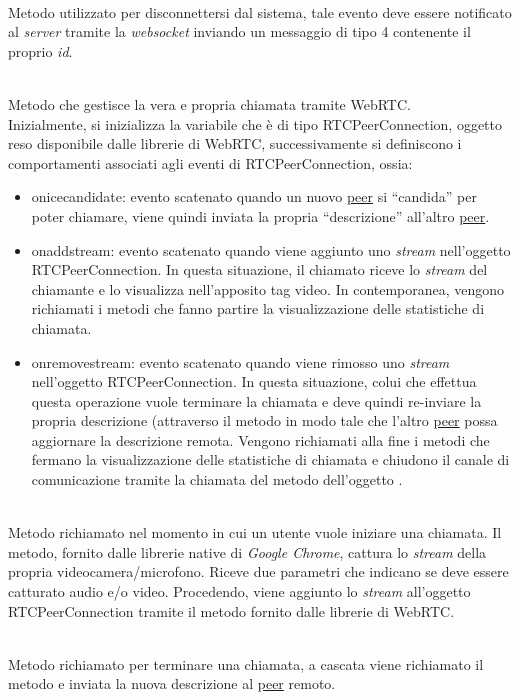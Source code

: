 \begin{description}
\item{}\\
Metodo utilizzato per disconnettersi dal sistema, tale evento deve essere notificato al \textit{server} tramite la \textit{websocket} inviando un messaggio di tipo 4 contenente il proprio \textit{id}.

\item{}\\
Metodo che gestisce la vera e propria chiamata tramite WebRTC.\\
Inizialmente, si inizializza la variabile  che è di tipo RTCPeerConnection, oggetto reso disponibile dalle librerie di WebRTC, successivamente si definiscono i comportamenti associati agli eventi di RTCPeerConnection, ossia:
\begin{itemize}
\item onicecandidate: evento scatenato quando un nuovo \underline{peer} si ``candida'' per poter chiamare, viene quindi inviata la propria ``descrizione'' all'altro \underline{peer}.
\item onaddstream: evento scatenato quando viene aggiunto uno \textit{stream} nell'oggetto RTCPeerConnection. In questa situazione, il chiamato riceve lo \textit{stream} del chiamante e lo visualizza nell'apposito tag video. In contemporanea, vengono richiamati i metodi che fanno partire la visualizzazione delle statistiche di chiamata.
\item onremovestream: evento scatenato quando viene rimosso uno \textit{stream} nell'oggetto RTCPeerConnection. In questa situazione, colui che effettua questa operazione vuole terminare la chiamata e deve quindi re-inviare la propria descrizione (attraverso il metodo  in modo tale che l'altro \underline{peer} possa aggiornare la descrizione remota. Vengono richiamati alla fine i metodi che fermano la visualizzazione delle statistiche di chiamata e chiudono il canale di comunicazione tramite la chiamata del metodo  dell'oggetto .
\end{itemize}

\item{}\\
Metodo richiamato nel momento in cui un utente vuole iniziare una chiamata. Il metodo, fornito dalle librerie native di \textit{Google Chrome}, cattura lo \textit{stream} della propria videocamera/microfono. Riceve due parametri che indicano se deve essere catturato audio e/o video. Procedendo, viene aggiunto lo \textit{stream} all'oggetto RTCPeerConnection tramite il metodo  fornito dalle librerie di WebRTC.

\item{}\\
Metodo richiamato per terminare una chiamata, a cascata viene richiamato il metodo  e inviata la nuova descrizione al \underline{peer} remoto.
 
 \end{description}

